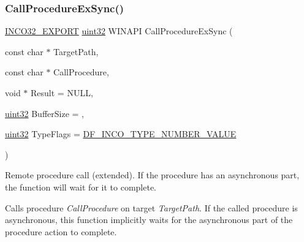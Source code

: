 \subsubsection{\texorpdfstring{Call\+Procedure\+Ex\+Sync()}{CallProcedureExSync()}}
{\footnotesize\ttfamily \hyperlink{inco__32_8h_a09505cad5bbb66fc36750a4fbca0444b}{I\+N\+C\+O32\+\_\+\+E\+X\+P\+O\+RT} \hyperlink{indeltypes_8h_a4b435a49c74bb91f284f075e63416cb6}{uint32} W\+I\+N\+A\+PI Call\+Procedure\+Ex\+Sync (\begin{DoxyParamCaption}\item[{const char $\ast$}]{Target\+Path,  }\item[{const char $\ast$}]{Call\+Procedure,  }\item[{void $\ast$}]{Result = {\ttfamily NULL},  }\item[{\hyperlink{indeltypes_8h_a4b435a49c74bb91f284f075e63416cb6}{uint32}}]{Buffer\+Size = {},  }\item[{\hyperlink{indeltypes_8h_a4b435a49c74bb91f284f075e63416cb6}{uint32}}]{Type\+Flags = {\ttfamily \hyperlink{indeldefs_8h_a0f27c7a63f462a5f51c285c85d7a5cac}{D\+F\+\_\+\+I\+N\+C\+O\+\_\+\+T\+Y\+P\+E\+\_\+\+N\+U\+M\+B\+E\+R\+\_\+\+V\+A\+L\+UE}} }\end{DoxyParamCaption})}



Remote procedure call (extended). If the procedure has an asynchronous part, the function will wait for it to complete. 

Calls procedure {\itshape Call\+Procedure} on target {\itshape Target\+Path}. If the called procedure is asynchronous, this function implicitly waits for the asynchronous part of the procedure action to complete.


